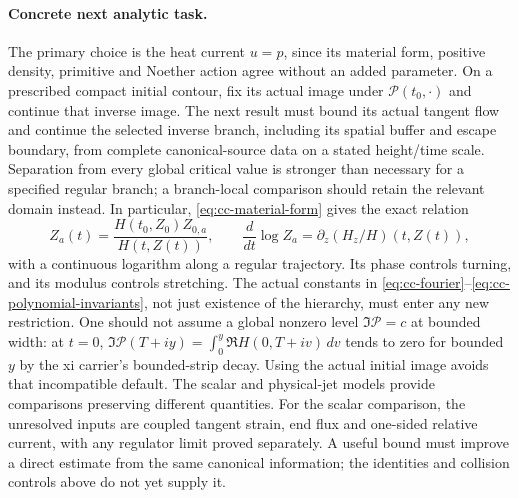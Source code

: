 \paragraph{Concrete next analytic task.}
The primary choice is the heat current $u=p$, since its material form,
positive density, primitive and Noether action agree without an added
parameter.  On a prescribed compact initial contour, fix its actual
image under $\mathcal P(t_0,\cdot)$ and continue that inverse image.
The next result must bound its actual tangent flow and continue the
selected inverse branch, including its spatial buffer and escape
boundary, from complete canonical-source data on a stated height/time
scale. Separation from every global critical value is stronger than
necessary for a specified regular branch; a branch-local comparison
should retain the relevant domain instead.  In particular, \eqref{eq:cc-material-form} gives the exact relation
\[
 Z_a(t)=\frac{H(t_0,Z_0)Z_{0,a}}{H(t,Z(t))},\qquad
 \frac{d}{dt}\log Z_a=\partial_z(H_z/H)(t,Z(t)),
\]
with a continuous logarithm along a regular trajectory. Its phase controls
turning, and its modulus controls stretching. The actual
constants in \eqref{eq:cc-fourier}--\eqref{eq:cc-polynomial-invariants},
not just existence of the hierarchy, must enter any new restriction.
One should not assume a global nonzero level $\Im\mathcal P=c$ at
bounded width: at $t=0$,
$\Im\mathcal P(T+iy)=\int_0^y\Re H(0,T+iv)\,dv$ tends to zero for
bounded $y$ by the xi carrier's bounded-strip decay.  Using the actual
initial image avoids that incompatible default.
The scalar and physical-jet models provide comparisons preserving
different quantities.  For the scalar comparison, the unresolved
inputs are coupled tangent strain, end flux and one-sided relative
current, with any regulator limit proved separately.  A useful bound
must improve a direct estimate from the same canonical information;
the identities and collision controls above do not yet supply it.

